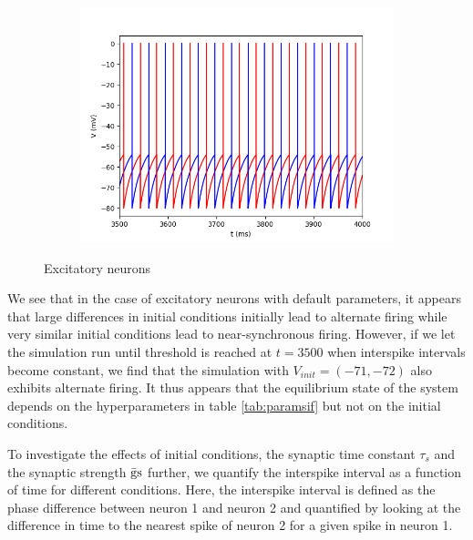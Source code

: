 \documentclass{article}
\begin{document}
\begin{figure}[h]
\begin{subfigure}[t]{0.30\linewidth}
		\label{fig:V71e}	
	\end{subfigure}%
	\hspace{0.03\linewidth}
	\begin{subfigure}[t]{0.30\linewidth}
		\centering
		\includegraphics[width = 1.0\linewidth, trim={0 0 0 0}, clip=true]{V_70_71e_late.png}
		\label{fig:V71e_late}	
	\end{subfigure}%
\caption{Excitatory neurons}
\label{fig:IFe}
\end{figure}

We see that in the case of excitatory neurons with default parameters, it appears that large differences in initial conditions initially lead to alternate firing while very similar initial conditions lead to near-synchronous firing. However, if we let the simulation run until threshold is reached at $t=3500$ when interspike intervals become constant, we find that the simulation with $V_{init} = (-71, -72)$ also exhibits alternate firing.
It thus appears that the equilibrium state of the system depends on the hyperparameters in table \ref{tab:paramsif} but not on the initial conditions.

To investigate the effects of initial conditions, the synaptic time constant $\tau_s$ and the synaptic strength $\rm \bar gs$ further, we quantify the interspike interval as a function of time for different conditions. Here, the interspike interval is defined as the phase difference between neuron 1 and neuron 2 and quantified by looking at the difference in time to the nearest spike of neuron 2 for a given spike in neuron 1.
\end{document}

